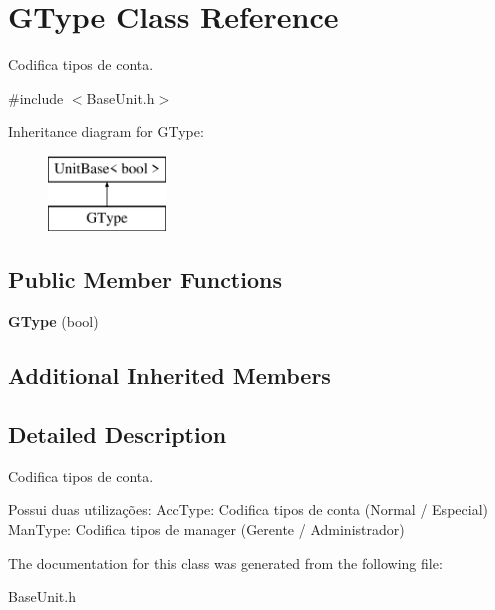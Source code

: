 \hypertarget{classGType}{\section{G\-Type Class Reference}
\label{classGType}
}


Codifica tipos de conta.  




{\ttfamily \#include $<$Base\-Unit.\-h$>$}

Inheritance diagram for G\-Type\-:\begin{figure}[H]
\begin{center}
\leavevmode
\includegraphics[height=2.000000cm]{classGType}
\end{center}
\end{figure}
\subsection*{Public Member Functions}
\begin{DoxyCompactItemize}
\item 
\hypertarget{classGType_a5ab14b6dd6554361e36353ac2b4f9b7d}{{\bfseries G\-Type} (bool)}\label{classGType_a5ab14b6dd6554361e36353ac2b4f9b7d}

\end{DoxyCompactItemize}
\subsection*{Additional Inherited Members}


\subsection{Detailed Description}
Codifica tipos de conta. 

Possui duas utilizações\-: Acc\-Type\-: Codifica tipos de conta (Normal / Especial) Man\-Type\-: Codifica tipos de manager (Gerente / Administrador) 

The documentation for this class was generated from the following file\-:\begin{DoxyCompactItemize}
\item 
Base\-Unit.\-h\end{DoxyCompactItemize}
